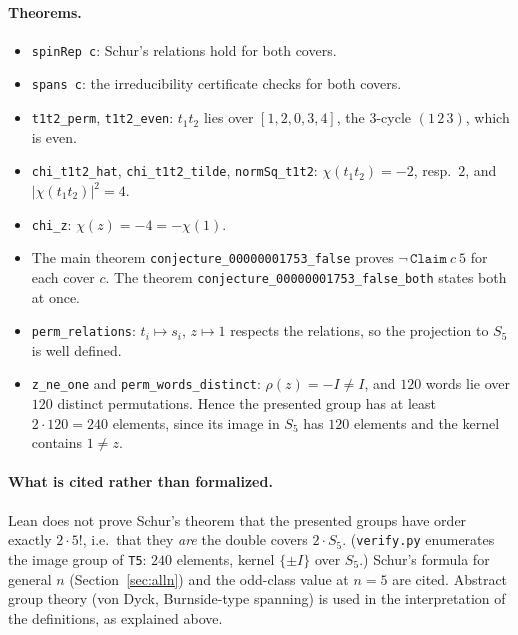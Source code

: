 \documentclass[11pt]{article}
\theoremstyle{remark}
\begin{document}
\paragraph{Theorems.}
\begin{itemize}
\item \texttt{spinRep c}: Schur's relations hold for both covers.
\item \texttt{spans c}: the irreducibility certificate checks for both covers.
\item \texttt{t1t2\_perm}, \texttt{t1t2\_even}: $t_1t_2$ lies over $[1,2,0,3,4]$, the $3$-cycle
  $(1\,2\,3)$, which is even.
\item \texttt{chi\_t1t2\_hat}, \texttt{chi\_t1t2\_tilde}, \texttt{normSq\_t1t2}: $\chi(t_1t_2)=-2$,
  resp.\ $2$, and $|\chi(t_1t_2)|^2=4$.
\item \texttt{chi\_z}: $\chi(z)=-4=-\chi(1)$.
\item The main theorem \texttt{conjecture\_00000001753\_false} proves
  $\neg\,\texttt{Claim}\ c\ 5$ for each cover $c$. The theorem
  \texttt{conjecture\_00000001753\_false\_both} states both at once.
\item \texttt{perm\_relations}: $t_i\mapsto s_i$, $z\mapsto1$ respects the relations, so the
  projection to $S_5$ is well defined.
\item \texttt{z\_ne\_one} and \texttt{perm\_words\_distinct}: $\rho(z)=-I\ne I$, and $120$ words lie
  over $120$ distinct permutations. Hence the presented group has at least $2\cdot120=240$
  elements, since its image in $S_5$ has $120$ elements and the kernel contains $1\ne z$.
\end{itemize}

\paragraph{What is cited rather than formalized.} Lean does not prove Schur's theorem that the
presented groups have order exactly $2\cdot5!$, i.e.\ that they \emph{are} the double covers
$2\cdot S_5$. (\texttt{verify.py} enumerates the image group of \texttt{T5}: $240$ elements, kernel
$\{\pm I\}$ over $S_5$.) Schur's formula for general $n$ (Section~\ref{sec:alln}) and the
odd-class value at $n=5$ are cited. Abstract group theory (von Dyck, Burnside-type spanning) is
used in the interpretation of the definitions, as explained above.
\end{document}
